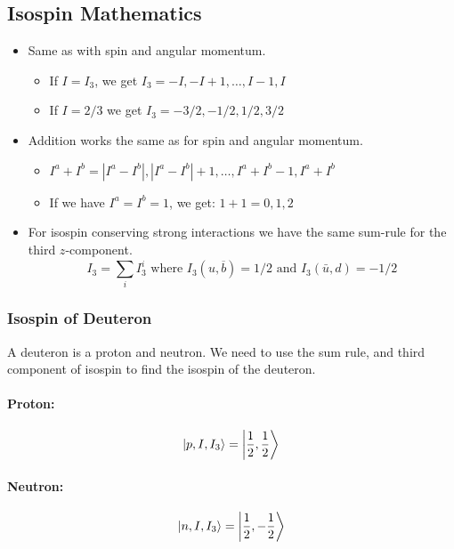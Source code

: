 \subsection{Isospin Mathematics}
\begin{itemize}
    \item Same as with spin and angular momentum. 
    \begin{itemize}
        \item If $I = I_3$, we get $I_3 = -I, -I + 1, \ldots  , I - 1, I$
        \item If $I = 2 / 3$ we get $I_3 = -3 / 2, -1 / 2, 1 / 2, 3 / 2$
    \end{itemize}
    \item Addition works the same as for spin and angular momentum. 
    \begin{itemize}
        \item $I^{a} + I^{b} = \left|I^{a} - I^{b}\right|, \left|I^{a} - I^{b}\right| + 1, \ldots  ,I^{a} + I^{b}-1, I^{a} + I^{b}$
        \item If we have $I^{a} = I^{b} = 1$, we get: $1 + 1 = 0, 1, 2$
    \end{itemize} 
    \item For isospin conserving strong interactions we have the same sum-rule for the third $z$-component. 
    \begin{equation}
      I_3 = ∑_{i}^{} I_3^{i} \text{ where } I_3 (u, \overline{b}) = 1 / 2 \text{ and } I_3 (\bar{u}, d) = -1 / 2
    \end{equation}
\end{itemize}

\subsubsection{Isospin of Deuteron}
A deuteron is a proton and neutron. We need to use the sum rule, and third component of isospin to find the isospin of the deuteron.
\paragraph{Proton:}
\begin{equation}
  \ket{p, I, I_3} = \ket{\frac{1}{2}, \frac{1}{2}}
\end{equation}
\paragraph{Neutron:}
\begin{equation}
    \ket{n, I, I_3} = \ket{\frac{1}{2}, -\frac{1}{2}}
\end{equation}

